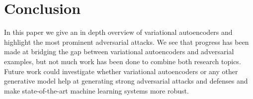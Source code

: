 \section{Conclusion}
In this paper we give an in depth overview of variational autoencoders and
highlight the most prominent adversarial attacks. We see that progress has been
made at bridging the gap between variational autoencoders and adversarial
examples, but not much work has been done to combine both research topics. Future work could
investigate whether variational autoencoders or any other generative model help
at generating strong adversarial attacks and defenses and make state-of-the-art
machine learning systems more robust.